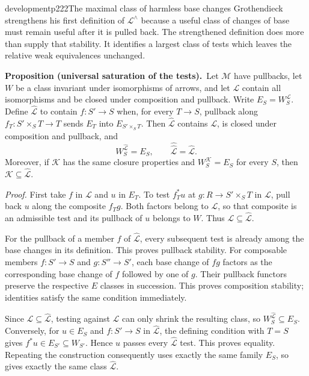 \begin{dcomment}{development}{p222}{The maximal class of harmless base changes}
Grothendieck strengthens his first definition of $\mathcal L^\wedge$ because a useful class of changes of base must remain useful after it is pulled back. The strengthened definition does more than supply that stability. It identifies a largest class of tests which leaves the relative weak equivalences unchanged.

\textbf{Proposition (universal saturation of the tests).}\ours\
Let $\mathcal M$ have pullbacks, let $W$ be a class invariant under isomorphisms of arrows, and let $\mathcal L$ contain all isomorphisms and be closed under composition and pullback. Write $E_S=W^{\mathcal L}_S$. Define $\widehat{\mathcal L}$ to contain $f:S'\to S$ when, for every $T\to S$, pullback along $f_T:S'\times_ST\to T$ sends $E_T$ into $E_{S'\times_ST}$. Then $\widehat{\mathcal L}$ contains $\mathcal L$, is closed under composition and pullback, and
\[
 W^{\widehat{\mathcal L}}_S=E_S,\qquad
 \widehat{\widehat{\mathcal L}}=\widehat{\mathcal L}.
\]
Moreover, if $\mathcal K$ has the same closure properties and $W^{\mathcal K}_S=E_S$ for every $S$, then $\mathcal K\subseteq\widehat{\mathcal L}$.

\textit{Proof.} First take $f$ in $\mathcal L$ and $u$ in $E_T$. To test $f_T^*u$ at $g:R\to S'\times_ST$ in $\mathcal L$, pull back $u$ along the composite $f_Tg$. Both factors belong to $\mathcal L$, so that composite is an admissible test and its pullback of $u$ belongs to $W$. Thus $\mathcal L\subseteq\widehat{\mathcal L}$.

For the pullback of a member $f$ of $\widehat{\mathcal L}$, every subsequent test is already among the base changes in its definition. This proves pullback stability. For composable members $f:S'\to S$ and $g:S''\to S'$, each base change of $fg$ factors as the corresponding base change of $f$ followed by one of $g$. Their pullback functors preserve the respective $E$ classes in succession. This proves composition stability; identities satisfy the same condition immediately.

Since $\mathcal L\subseteq\widehat{\mathcal L}$, testing against $\widehat{\mathcal L}$ can only shrink the resulting class, so $W^{\widehat{\mathcal L}}_S\subseteq E_S$. Conversely, for $u\in E_S$ and $f:S'\to S$ in $\widehat{\mathcal L}$, the defining condition with $T=S$ gives $f^*u\in E_{S'}\subseteq W_{S'}$. Hence $u$ passes every $\widehat{\mathcal L}$ test. This proves equality. Repeating the construction consequently uses exactly the same family $E_S$, so gives exactly the same class $\widehat{\mathcal L}$.


\end{dcomment}
